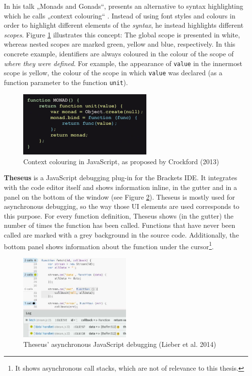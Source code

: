In his talk „Monads and Gonads“,  presents an
alternative to syntax highlighting which he calls „context colouring“
\citeyear{crockford}. Instead of using font styles and colours in order
to highlight different elements of the \emph{syntax}, he instead
highlights different \emph{scopes}. Figure \ref{fig:contexthighlighting}
illustrates this concept: The global scope is presented in white,
whereas nested scopes are marked green, yellow and blue, respectively.
In this concrete example, identifiers are always coloured in the colour
of the scope of \emph{where they were defined}. For example, the
appearance of \texttt{value} in the innermost scope is yellow, the
colour of the scope in which \texttt{value} was declared (as a function
parameter to the function \texttt{unit}).

\begin{figure}[H]
\centering
\includegraphics[keepaspectratio,width=0.6\textwidth]{img/context.png}
\caption{Context colouring in JavaScript, as proposed by Crockford (2013)}
\label{fig:contexthighlighting}
\end{figure}

\textbf{Theseus} is a JavaScript debugging plug-in for the Brackets IDE.
It integrates with the code editor itself and shows information inline,
in the gutter and in a panel on the bottom of the window (see Figure
\ref{fig:theseus}). Theseus is mostly used for asynchronous debugging,
so the way those UI elements are used corresponds to this purpose. For
every function definition, Theseus shows (in the gutter) the number of
times the function has been called. Functions that have never been
called are marked with a grey background in the source code.
Additionally, the bottom panel shows information about the function
under the
cursor\footnote{It shows asynchronous call stacks, which are not of relevance to this thesis.}.

\begin{figure}[H]
\centering
\includegraphics[keepaspectratio,width=0.5\textwidth]{img/theseus.jpg}
\caption{Theseus’ asynchronous JavaScript debugging (Lieber et al. 2014)}
\label{fig:theseus}
\end{figure}

